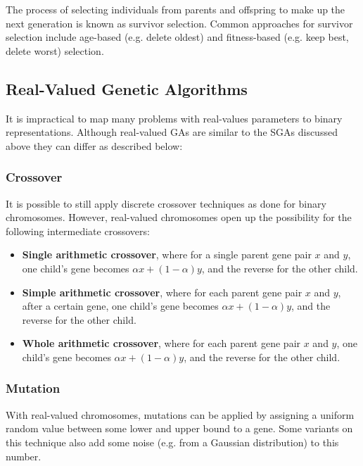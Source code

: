 \documentclass[12pt,titlepage]{article}
\begin{document}
        The process of selecting individuals from parents and offspring to make up the next generation is known as survivor selection. Common approaches for survivor selection
        include age-based (e.g. delete oldest) and fitness-based (e.g. keep best, delete worst) selection.

    \subsection{Real-Valued Genetic Algorithms}
      It is impractical to map many problems with real-values parameters to binary representations. Although real-valued GAs are similar to the SGAs discussed above they can
      differ as described below:

      \subsubsection{Crossover}
        It is possible to still apply discrete crossover techniques as done for binary chromosomes. However, real-valued chromosomes open up the possibility for the following
        intermediate crossovers:
        \begin{itemize}
          \item \textbf{Single arithmetic crossover}, where for a single parent gene pair $x$ and $y$, one child's gene becomes $\alpha x + (1 - \alpha) y$, and the reverse for the other child. 
          \item \textbf{Simple arithmetic crossover}, where for each parent gene pair $x$ and $y$, after a certain gene, one child's gene becomes $\alpha x + (1 - \alpha) y$, and the reverse
            for the other child. 
          \item \textbf{Whole arithmetic crossover}, where for each parent gene pair $x$ and $y$, one child's gene becomes $\alpha x + (1 - \alpha) y$, and the reverse for the other child.
        \end{itemize}

      \subsubsection{Mutation}
        With real-valued chromosomes, mutations can be applied by assigning a uniform random value between some lower and upper bound to a gene. Some variants on this technique also
        add some noise (e.g. from a Gaussian distribution) to this number.
\end{document}
